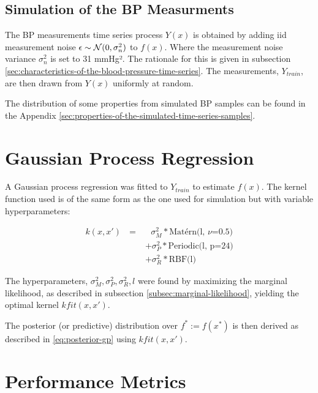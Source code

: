 \subsection{Simulation of the BP Measurments}

The BP measurements time series process $Y(x)$ is obtained by adding iid measurement noise
$\epsilon \sim \operatorname{\mathcal{N}}(0, \sigma_n^2)$ to $f(x)$.
Where the measurement noise variance $\sigma_n^2$ is set to 31 mmHg².
The rationale for this is given in subsection
\ref{sec:characteristics-of-the-blood-pressure-time-series}.
The measurements, $Y_{train}$, are then drawn from $Y(x)$ uniformly at random.

The distribution of some properties from simulated BP samples can be found in the
Appendix \ref{sec:properties-of-the-simulated-time-series-samples}.


\section{Gaussian Process Regression}\label{sec:gaussian-process-regression}

A Gaussian process regression was fitted to $Y_{train}$ to estimate $f(x)$.
The kernel function used is of the same form as the one used for simulation
but with variable hyperparameters:

\begin{align*}\label{def:gp_fit}
    k(x, x') \text{ } = &\text{ } \sigma_M^2 * \text{Matérn(l, $\nu$=0.5)} \\
             &+ \sigma_P^2 * \text{Periodic(l, p=24)} \\
             &+  \sigma_R^2 * \text{RBF(l)}
\end{align*}

The hyperparameters, $\sigma_M^2, \sigma_P^2, \sigma_R^2, l$  were found by
maximizing the marginal likelihood, as described in subsection
\ref{subsec:marginal-likelihood}, yielding the optimal kernel $kfit(x,x')$.

The posterior (or predictive) distribution over $f^{\ast} := f(x^\ast)$ is then
derived as described in \ref{eq:posterior-gp} using $kfit(x,x')$.
%


\section{Performance Metrics}\label{sec:performance-metric}


